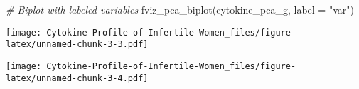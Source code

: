 \documentclass[
]{article}
\newenvironment{Shaded}{\begin{snugshade}}{\end{snugshade}}
\newcommand{\AttributeTok}[1]{\textcolor[rgb]{0.77,0.63,0.00}{#1}}
\newcommand{\CommentTok}[1]{\textcolor[rgb]{0.56,0.35,0.01}{\textit{#1}}}
\newcommand{\FunctionTok}[1]{\textcolor[rgb]{0.00,0.00,0.00}{#1}}
\newcommand{\NormalTok}[1]{#1}
\newcommand{\SpecialCharTok}[1]{\textcolor[rgb]{0.00,0.00,0.00}{#1}}
\newcommand{\StringTok}[1]{\textcolor[rgb]{0.31,0.60,0.02}{#1}}
\begin{document}
\begin{Shaded}
\begin{Highlighting}[]
\CommentTok{\# Biplot with labeled variables}
\FunctionTok{fviz\_pca\_biplot}\NormalTok{(cytokine\_pca\_g,}
                \AttributeTok{label =} \StringTok{"var"}\NormalTok{)}
\end{Highlighting}
\end{Shaded}

\texttt{[image: Cytokine-Profile-of-Infertile-Women\_files/figure-latex/unnamed-chunk-3-3.pdf]}

\begin{Shaded}
\end{Shaded}

\texttt{[image: Cytokine-Profile-of-Infertile-Women\_files/figure-latex/unnamed-chunk-3-4.pdf]}
\end{document}
